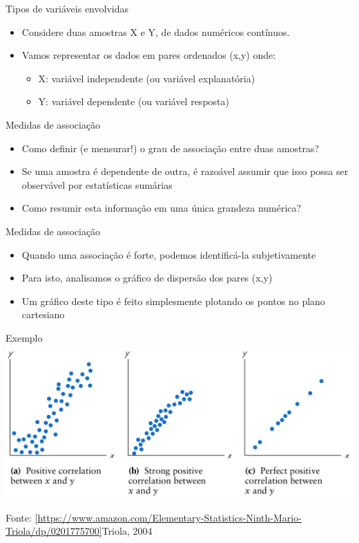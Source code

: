\documentclass{beamer}
\begin{document}
\begin{frame}{\scriptsize Tipos de variáveis envolvidas}
  \begin{itemize}
    \footnotesize
  \item Considere duas amostras X e Y, de dados numéricos contínuos.
    \bigskip
  \item Vamos representar os dados em pares ordenados (x,y) onde:
    \begin{itemize}
      \scriptsize
    \item X: variável independente (ou variável explanatória)
    \item Y: variável dependente (ou variável resposta)
    \end{itemize}
  \end{itemize}
\end{frame}

\begin{frame}{\scriptsize Medidas de associação}
  \begin{itemize}
    \footnotesize
  \item Como definir (e mensurar!) o grau de associação entre duas amostras?
    \bigskip
  \item Se uma amostra é dependente de outra, é razoável assumir que isso
    possa ser observável por estatísticas sumárias
    \bigskip
  \item Como resumir esta informação em uma única grandeza numérica?
  \end{itemize}
\end{frame}

\begin{frame}{\scriptsize Medidas de associação}
  \begin{itemize}
    \footnotesize
  \item Quando uma associação é forte, podemos identificá-la
    subjetivamente
    \bigskip
  \item Para isto, analisamos o gráfico de dispersão dos pares (x,y)
    \bigskip
  \item Um gráfico deste tipo é feito simplesmente plotando os pontos
    no plano cartesiano
  \end{itemize}
\end{frame}

\begin{frame}{\scriptsize Exemplo}
  \includegraphics[height=0.6\textheight]{Cap17/positive}

  \vfill
  \hfill \tiny Fonte: \ref{https://www.amazon.com/Elementary-Statistics-Ninth-Mario-Triola/dp/0201775700}{Triola, 2004}
\end{frame}
\end{document}
